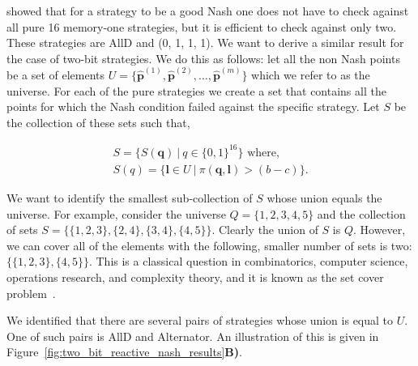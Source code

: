 \documentclass{article}
\theoremstyle{definition}
\begin{document}
\citep{akin:EGADS:2016} showed that for a strategy to be a good Nash one does
not have to check against all pure 16 memory-one strategies, but it is efficient
to check against only two. These strategies are AllD and (0, 1, 1, 1). We want
to derive a similar result for the case of two-bit strategies. We do this as
follows: let all the non Nash points be a
set of elements \(U = \{ \mathbf{\hat{p}}^{(1)}, \mathbf{\hat{p}}^{(2)}, \dots,
\mathbf{\hat{p}}^{(m)}\}\) which we refer to as the universe. For each of the
pure strategies we create a set that contains all the points for which the Nash
condition failed against the specific strategy. Let \(S\) be the collection of
these sets such that,

\begin{align*}
  S = \{S(\mathbf{q}) \ | \ q \in \{0, 1\} ^ {16} \} \text{ where,}\\
  S(q) = \{\mathbf{l} \in U \ | \ \pi( \mathbf{q},  \mathbf{l}) > (b - c)\}.
\end{align*}

We want to identify the smallest sub-collection of \(S\) whose union equals the
universe. For example, consider the universe \(Q = \{1, 2, 3, 4, 5\}\) and the
collection of sets \(S = \{ \{1, 2, 3\}, \{2, 4\}, \{3, 4\}, \{4, 5\} \}\).
Clearly the union of \(S\) is \(Q\). However, we can cover all of the elements
with the following, smaller number of sets is two: \(\{ \{1, 2, 3\}, \{4, 5\}
\}\). This is a classical question in combinatorics, computer science,
operations research, and complexity theory, and it is known as the set cover
problem~\citep{beasley:EJOR:1987}.

We identified that there are several pairs of strategies whose union is
equal to \(U\). One of such pairs is AllD and Alternator. An
illustration of this is
given in Figure~\ref{fig:two_bit_reactive_nash_results}\textbf{B)}.
\end{document}
